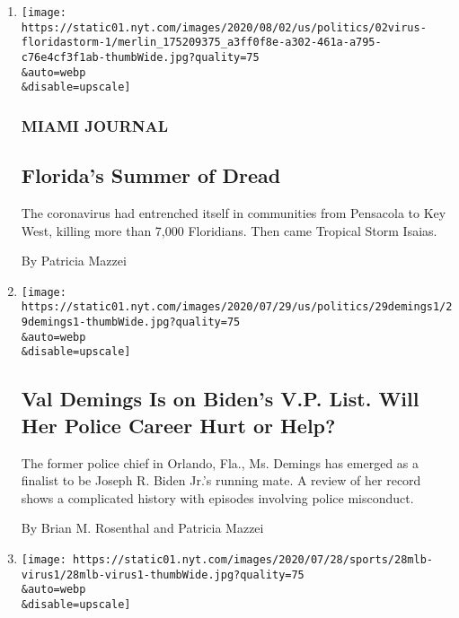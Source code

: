 \begin{enumerate}
\def\labelenumi{\arabic{enumi}.}
\item
  \href{/2020/08/02/us/florida-hurricane-isaias-coronavirus.html}{}

  \texttt{[image: https://static01.nyt.com/images/2020/08/02/us/politics/02virus-floridastorm-1/merlin\_175209375\_a3ff0f8e-a302-461a-a795-c76e4cf3f1ab-thumbWide.jpg?quality=75\\\&auto=webp\\\&disable=upscale]}

  \hypertarget{miami-journal}{%
  \subsubsection{MIAMI JOURNAL}\label{miami-journal}}

  \hypertarget{floridas-summer-of-dread}{%
  \subsection{Florida's Summer of
  Dread}\label{floridas-summer-of-dread}}

  The coronavirus had entrenched itself in communities from Pensacola to
  Key West, killing more than 7,000 Floridians. Then came Tropical Storm
  Isaias.

  By Patricia Mazzei
\item
  \href{/article/val-demings-biden-vp.html}{}

  \texttt{[image: https://static01.nyt.com/images/2020/07/29/us/politics/29demings1/29demings1-thumbWide.jpg?quality=75\\\&auto=webp\\\&disable=upscale]}

  \hypertarget{val-demings-is-on-bidens-vp-list-will-her-police-career-hurt-or-help}{%
  \subsection{Val Demings Is on Biden's V.P. List. Will Her Police
  Career Hurt or
  Help?}\label{val-demings-is-on-bidens-vp-list-will-her-police-career-hurt-or-help}}

  The former police chief in Orlando, Fla., Ms. Demings has emerged as a
  finalist to be Joseph R. Biden Jr.'s running mate. A review of her
  record shows a complicated history with episodes involving police
  misconduct.

  By Brian M. Rosenthal and Patricia Mazzei
\item
  \href{/2020/07/28/sports/baseball/marlins-outbreak-mlb-coronavirus.html}{}

  \texttt{[image: https://static01.nyt.com/images/2020/07/28/sports/28mlb-virus1/28mlb-virus1-thumbWide.jpg?quality=75\\\&auto=webp\\\&disable=upscale]}


\end{enumerate}
